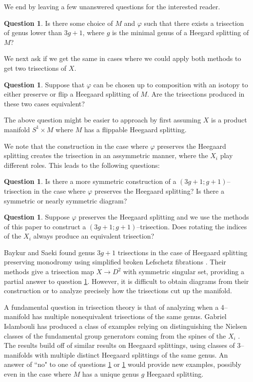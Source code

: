 \documentclass[12pt]{amsart}
\theoremstyle{definition}
\newtheorem{question}[thm]{Question}
\theoremstyle{remark}
\begin{document}
We end by leaving a few unanswered questions for the interested reader.

\begin{question}
Is there some choice of $M$ and $\varphi$ such that there exists a trisection of genus lower than $3g+1$, where $g$ is the minimal genus of a Heegard splitting of $M$?
\end{question}

We next ask if we get the same in cases where we could apply both methods to get two trisections of $X$.

\begin{question}
Suppose that $\varphi$ can be chosen up to composition with an isotopy to either preserve or flip a Heegaard splitting of $M$.
 Are the trisections produced in these two cases equivalent?
\label{unequal1}
\end{question}

The above question might be easier to approach by first assuming $X$ is a product manifold $S^1 \times M$ where $M$ has a flippable Heegaard splitting.


We note that the construction in the case where $\varphi$ preserves the Heegaard splitting creates the trisection in an assymmetric manner, where the $X_i$ play different roles.
This leads to the following questions:
\begin{question}
\label{q_assym}
Is there a more symmetric construction of a $(3g+1;g+1)$--trisection in the case where $\varphi$ preserves the Heegaard splitting?  Is there a symmetric or nearly symmetric diagram?
\end{question}

\begin{question}
Suppose $\varphi$ preserves the Heegaard splitting and we use the methods of this paper to construct a $(3g+1;g+1)$--trisection.
Does rotating the indices of the $X_i$ always produce an equivalent trisection?
\label{unequal3}
\end{question}

Baykur and Saeki found genus $3g+1$ trisections in the case of Heegaard splitting preserving monodromy using simplified broken Lefschetz fibrations \cite{BaykurSaeki1}.
Their methods give a trisection map $X \to D^2$ with symmetric singular set, providing a partial answer to question \ref{q_assym}.
However, it is difficult to obtain diagrams from their construction or to analyze precisely how the trisections cut up the manifold.


A fundamental question in trisection theory is that of analyzing when a 4--manifold has multiple nonequivalent trisections of the same genus.
Gabriel Islambouli has produced a class of examples relying on distinguishing the Nielsen classes of the fundamental group generators coming from the spines of the $X_i$ \cite{Islambouli1}.
The results build off of similar results on Heegaard splittings, using classes of 3--manifolds with multiple distinct Heegaard splittings of the same genus.
An answer of ``no" to one of questions \ref{unequal1} or \ref{unequal3} would provide new examples, possibly even in the case where $M$ has a unique genus $g$ Heegaard splitting.
\end{document}
